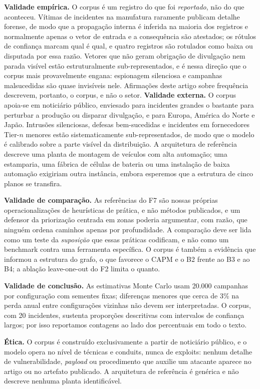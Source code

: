 \textbf{Validade empírica.} O corpus é um registro do que foi
\emph{reportado}, não do que aconteceu. Vítimas de incidentes na manufatura
raramente publicam detalhe forense, de modo que a propagação interna é
inferida na maioria dos registros e normalmente apenas o vetor de entrada e a
consequência são atestados; os rótulos de confiança marcam qual é qual, e
quatro registros são rotulados como baixa ou disputada por essa razão. Vetores
que não geram obrigação de divulgação nem parada visível estão estruturalmente
sub-representados, e é nessa direção que o corpus mais provavelmente engana:
espionagem silenciosa e campanhas malsucedidas são quase invisíveis nele.
Afirmações deste artigo sobre frequência descrevem, portanto, o corpus, e não
o setor.  \textbf{Validade externa.} O corpus apoia-se em noticiário público, enviesado
para incidentes grandes o bastante para perturbar a produção ou disparar
divulgação, e para Europa, América do Norte e Japão. Intrusões silenciosas,
defesas bem-sucedidas e incidentes em fornecedores Tier-$n$ menores estão
sistematicamente sub-representados, de modo que o modelo é calibrado sobre a
parte visível da distribuição. A arquitetura de referência descreve uma planta
de montagem de veículos com alta automação; uma estamparia, uma fábrica de
células de bateria ou uma instalação de baixa automação exigiriam outra
instância, embora esperemos que a estrutura de cinco planos se transfira.

\textbf{Validade de comparação.} As referências do F7 são nossas próprias
operacionalizações de heurísticas de prática, e não métodos publicados, e um
defensor da priorização centrada em zonas poderia argumentar, com razão, que
ninguém ordena caminhos apenas por profundidade. A comparação deve ser lida como
um teste da \emph{suposição} que essas práticas codificam, e não como um
benchmark contra uma ferramenta específica. O corpus é também a evidência que
informou a estrutura do grafo, o que favorece o CAPM e o B2 frente ao B3 e ao
B4; a ablação leave-one-out do F2 limita o quanto.

\textbf{Validade de conclusão.} As estimativas Monte Carlo usam 20.000
campanhas por configuração com sementes fixas; diferenças menores que cerca de
3\% na perda anual entre configurações vizinhas não devem ser interpretadas. O
corpus, com 20 incidentes, sustenta proporções descritivas com intervalos de
confiança largos; por isso reportamos contagens ao lado dos percentuais em todo
o texto.

\textbf{Ética.} O corpus é construído exclusivamente a partir de noticiário
público, e o modelo opera no nível de técnicas e conduits, nunca de exploits: nenhum detalhe de vulnerabilidade, \emph{payload} ou procedimento
que auxilie um atacante aparece no artigo ou no artefato publicado. A
arquitetura de referência é genérica e não descreve nenhuma planta
identificável.

